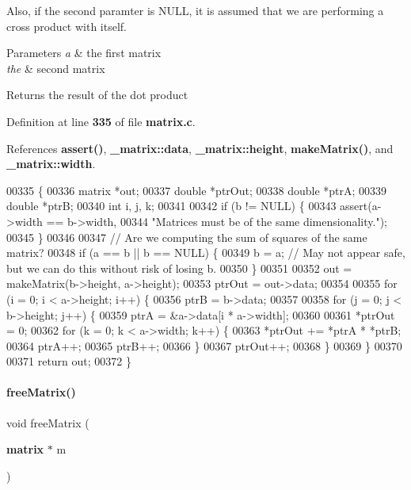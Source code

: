 Also, if the second paramter is N\+U\+LL, it is assumed that we are performing a cross product with itself. 
\begin{DoxyParams}{Parameters}
{\em a} & the first matrix \\
\hline
{\em the} & second matrix \\
\hline
\end{DoxyParams}
\begin{DoxyReturn}{Returns}
the result of the dot product 
\end{DoxyReturn}


Definition at line \textbf{ 335} of file \textbf{ matrix.\+c}.



References \textbf{ assert()}, \textbf{ \+\_\+matrix\+::data}, \textbf{ \+\_\+matrix\+::height}, \textbf{ make\+Matrix()}, and \textbf{ \+\_\+matrix\+::width}.


\begin{DoxyCode}
00335                                                \{
00336   matrix *out;
00337   \textcolor{keywordtype}{double} *ptrOut;
00338   \textcolor{keywordtype}{double} *ptrA;
00339   \textcolor{keywordtype}{double} *ptrB;
00340   \textcolor{keywordtype}{int} i, j, k;
00341 
00342   \textcolor{keywordflow}{if} (b != NULL) \{
00343     assert(a->width == b->width,
00344            \textcolor{stringliteral}{"Matrices must be of the same dimensionality."});
00345   \}
00346 
00347   \textcolor{comment}{// Are we computing the sum of squares of the same matrix?}
00348   \textcolor{keywordflow}{if} (a == b || b == NULL) \{
00349     b = a; \textcolor{comment}{// May not appear safe, but we can do this without risk of losing b.}
00350   \}
00351 
00352   out = makeMatrix(b->height, a->height);
00353   ptrOut = out->data;
00354 
00355   \textcolor{keywordflow}{for} (i = 0; i < a->height; i++) \{
00356     ptrB = b->data;
00357 
00358     \textcolor{keywordflow}{for} (j = 0; j < b->height; j++) \{
00359       ptrA = &a->data[i * a->width];
00360 
00361       *ptrOut = 0;
00362       \textcolor{keywordflow}{for} (k = 0; k < a->width; k++) \{
00363         *ptrOut += *ptrA * *ptrB;
00364         ptrA++;
00365         ptrB++;
00366       \}
00367       ptrOut++;
00368     \}
00369   \}
00370 
00371   \textcolor{keywordflow}{return} out;
00372 \}
\end{DoxyCode}
\mbox{\label{a00041_ae98365c910e9d688d2bdedec50d89a6b}} 
\paragraph{free\+Matrix()}
{\footnotesize\ttfamily void free\+Matrix (\begin{DoxyParamCaption}\item[{\textbf{ matrix} $\ast$}]{m }\end{DoxyParamCaption})}



